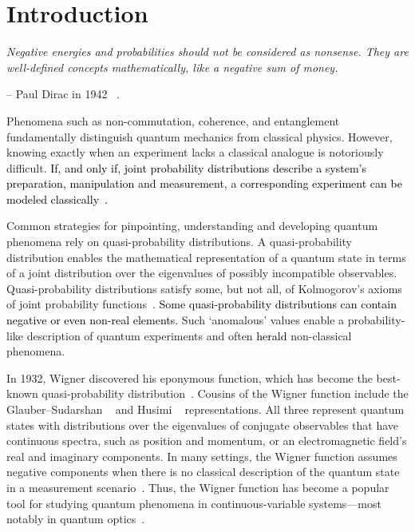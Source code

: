 \documentclass[%
 reprint,
superscriptaddress,
nofootinbib,
bibnotes,
 amsmath,amssymb,
 aps,
]{revtex4-1}
\theoremstyle{plain}
\newcommand{\Dave}[1]{\textcolor{black}{#1} }
\newcommand{\nicole}[1]{\textcolor{black}{#1} }
\begin{document}
\maketitle

\onecolumngrid

\tableofcontents

\section{Introduction}

\begin{displayquote}
\textit{Negative energies and probabilities should not be considered as nonsense.
They are well-defined concepts mathematically, like a negative sum of money.}

-- Paul Dirac in 1942 ~\cite{Dirac42}.
\end{displayquote}




Phenomena such as non-commutation, coherence, and entanglement fundamentally distinguish quantum mechanics from classical physics. However, knowing exactly when an experiment  lacks a classical analogue is notoriously difficult.   \Dave{If, and only if,  
\nicole{joint probability distributions describe  a system's preparation, manipulation and measurement,}
a corresponding experiment can be \nicole{modeled} classically~\cite{Dirac26, Dirac26-2, Wigner32,  Dirac45, Cohen66, Hudson74, Srinivas75, Griffiths84, Hartle04, spekkens2008negativity, Allahverdyan15}.   }



Common strategies for pinpointing, understanding and developing  quantum phenomena rely on quasi-probability distributions.   A quasi-probability distribution enables the mathematical representation of a quantum state in terms of a joint distribution over the eigenvalues of 
possibly  
incompatible observables. Quasi-probability distributions satisfy some, but not all,  of Kolmogorov's axioms of joint probability functions~\cite{Kolmogorov33}. \Dave{Some quasi-probability distributions can \nicole{contain negative or even non-real elements.}
}
Such `anomalous' values enable a probability-like description of quantum experiments and often \Dave{herald} non-classical phenomena. 



In 1932, Wigner discovered his eponymous function, which has become the best-known quasi-probability distribution~\cite{Wigner32,Ville48, moyal49, Wootters87}. 
Cousins of the Wigner function include the Glauber--Sudarshan ~\cite{Glauber63, Sudarshan63} and Husimi ~\cite{Husimi40} representations.
All three represent quantum states with  distributions over the eigenvalues of   conjugate observables that have continuous spectra,  such as position and momentum, or an electromagnetic field's real and imaginary components.  In many settings, the Wigner function assumes negative components when there is no classical description of the quantum state in a measurement scenario~\cite{Mari12, Booth22}.  Thus, the Wigner function has become a popular tool for studying quantum phenomena in continuous-variable systems---most notably in quantum optics~\cite{Mandel95}.
\end{document}
